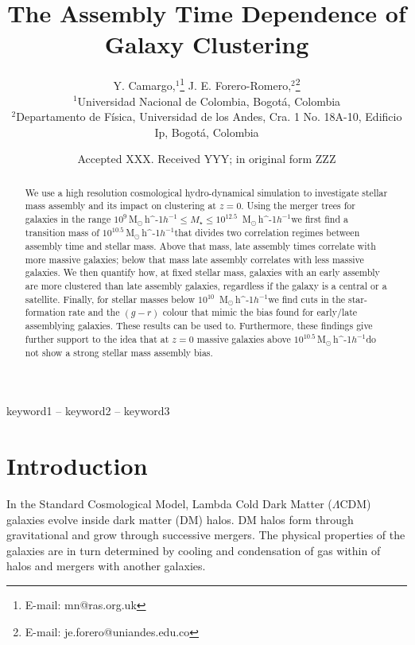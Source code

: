 \documentclass[a4paper,fleqn,usenatbib]{mnras}
\title[Galaxy Assembly Bias]{The Assembly Time Dependence of Galaxy Clustering}
\author[Camargo, Y. \& Forero-Romero J. E.]{
Y. Camargo,$^{1}$\thanks{E-mail: mn@ras.org.uk}
J. E. Forero-Romero,$^{2}$\thanks{E-mail: je.forero@uniandes.edu.co}
\\
$^{1}$Universidad Nacional de Colombia, Bogot\'a, Colombia\\
$^{2}$Departamento de F\'isica, Universidad de los Andes, Cra. 1 No.
18A-10, Edificio Ip, Bogot\'a, Colombia\\
}
\date{Accepted XXX. Received YYY; in original form ZZZ}
\newcommand{\Msunh}{\,{\rm M}$_{\odot}$\,\ifmmode h^{-1}\else $h^{-1}$\fi}
\begin{document}
\label{firstpage}
\pagerange{\pageref{firstpage}--\pageref{lastpage}}
\maketitle

\begin{abstract}
    We use a high resolution cosmological hydro-dynamical simulation
    to investigate stellar mass assembly 
    and its impact on clustering at $z=0$.
    Using the merger trees for galaxies in the range $10^{9}$\Msunh $\leq M_{\star} \leq 10^{12.5}$ \Msunh we first find a transition mass of $10^{10.5}$\Msunh that divides two
    correlation regimes between assembly time and stellar mass.
    Above that mass, late assembly times correlate with more massive
    galaxies; below that mass late assembly correlates with less massive
galaxies.
We then quantify how, at fixed stellar mass, galaxies with an early
assembly
are more clustered than late assembly galaxies, regardless if the galaxy
is a central or a satellite.
Finally, for stellar masses below $10^{10}$ \Msunh we find 
cuts in the star-formation rate and the $(g-r)$ colour that mimic
the bias found for early/late assemblying galaxies.
These results can be used to.
Furthermore, these findings give further support to the idea that at
$z=0$  massive galaxies above $10^{10.5}$\Msunh do not show a strong
stellar mass assembly bias.
\end{abstract}

\begin{keywords}
keyword1 -- keyword2 -- keyword3
\end{keywords}



\section{Introduction}
In the Standard Cosmological Model, Lambda Cold Dark Matter
($\Lambda$CDM) galaxies evolve inside dark matter (DM) halos.
DM halos form through gravitational and grow through successive
mergers.
The physical properties of the galaxies are in turn determined by
cooling and condensation of gas within of halos and mergers with
another galaxies.
\end{document}
